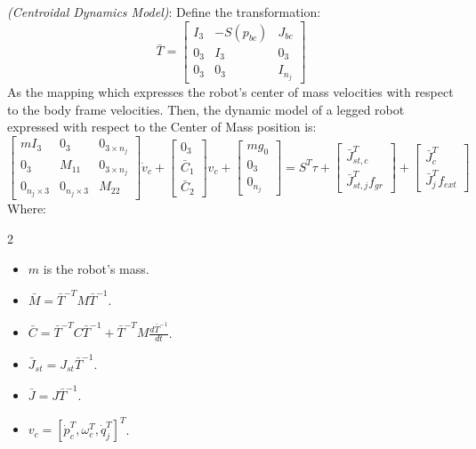 \begin{definition}
    \textit{(Centroidal Dynamics Model)}: Define the transformation:
    \begin{equation}\label{legged_CoM_coord_trans}
        \bar{T}=
        \begin{bmatrix}
            I_3 & -S(p_{bc}) & J_{bc}\\
            0_3 & I_3 & 0_3\\
            0_3 & 0_3 & I_{n_j}
        \end{bmatrix}
    \end{equation}
    As the mapping which expresses the robot's center of mass velocities with respect to the body frame velocities. Then, the dynamic model of a legged robot expressed with respect to the Center of Mass position is:
    \begin{equation}\label{legged_Centroidal_Dynamics_Model}
        \begin{bmatrix}
            mI_3 & 0_3 & 0_{3\times n_j}\\
            0_3 & M_{11} & 0_{3\times n_j}\\
            0_{n_j\times 3} & 0_{n_j\times 3} & M_{22}
        \end{bmatrix}
        \dot{v}_c+
        \begin{bmatrix}
            0_3\\
            \bar{C}_1\\
            \bar{C}_2
        \end{bmatrix}v_c+
        \begin{bmatrix}
            mg_0\\ 0_3 \\ 0_{n_j}
        \end{bmatrix}=S^{T}\tau+
        \begin{bmatrix}
            \bar{J}_{st,c}^{T}\\
            \bar{J}_{st,j}^{T}f_{gr}
        \end{bmatrix}+
        \begin{bmatrix}
            \bar{J}_{c}^{T}\\ \bar{J}_{j}^{T}f_{ext}
        \end{bmatrix}
    \end{equation}
    Where:
    \begin{multicols}{2}
        \begin{itemize}
            \item $m$ is the robot's mass.
            \item $\bar{M}=\bar{T}^{-T}M\bar{T}^{-1}$.
            \item $\bar{C}=\bar{T}^{-T}C\bar{T}^{-1}+\bar{T}^{-T}M\frac{d\bar{T}^{-1}}{dt}$.
            \item $\bar{J}_{st}=J_{st}\bar{T}^{-1}$.
            \item $\bar{J}=J\bar{T}^{-1}$.
            \item $v_c=[\dot{p}_c^T,\omega_c^T,\dot{q}_j^T]^T$.
        \end{itemize}
    \end{multicols}
\end{definition}
